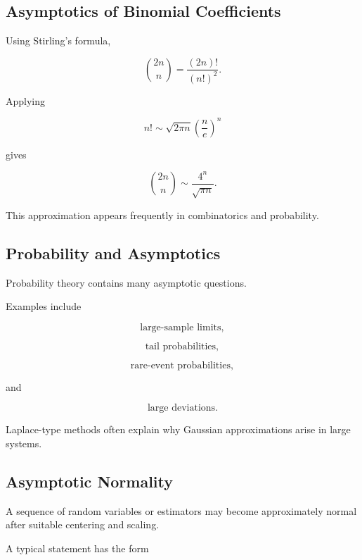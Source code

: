 \subsection{Asymptotics of Binomial Coefficients}
\label{subsec:binomial-asymptotics}

Using Stirling's formula,

\[
\binom{2n}{n}
=
\frac{(2n)!}{(n!)^2}.
\]

Applying

\[
n!
\sim
\sqrt{2\pi n}
\left(\frac ne\right)^n
\]

gives

\[
\boxed{
\binom{2n}{n}
\sim
\frac{4^n}{\sqrt{\pi n}}.
}
\]

This approximation appears frequently in combinatorics and probability.

\subsection{Probability and Asymptotics}
\label{subsec:probability-asymptotics}

Probability theory contains many asymptotic questions.

Examples include

\[
\boxed{
\text{large-sample limits},
}
\]

\[
\boxed{
\text{tail probabilities},
}
\]

\[
\boxed{
\text{rare-event probabilities},
}
\]

and

\[
\boxed{
\text{large deviations}.
}
\]

Laplace-type methods often explain why Gaussian approximations arise in
large systems.

\subsection{Asymptotic Normality}
\label{subsec:asymptotic-normality}

A sequence of random variables or estimators may become approximately
normal after suitable centering and scaling.

A typical statement has the form

